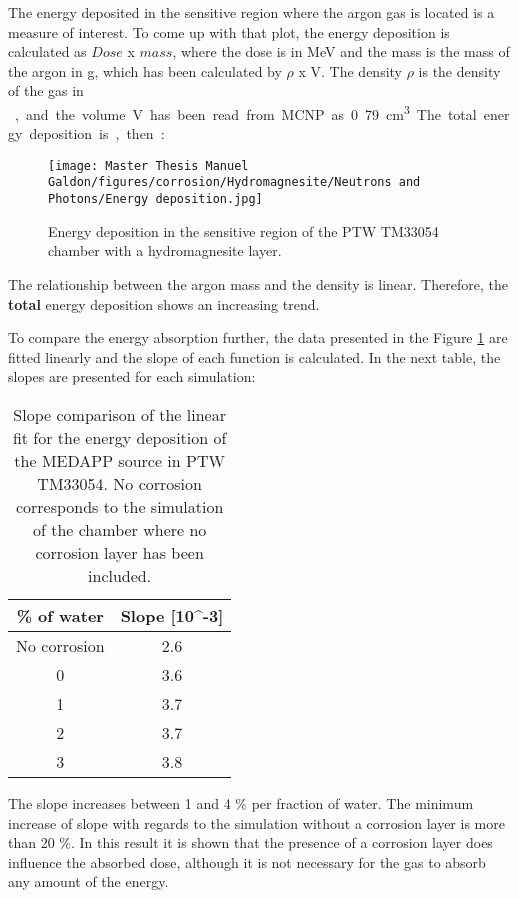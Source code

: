 The energy deposited in the sensitive region where the argon gas is located is a measure of interest. To come up with that plot, the energy deposition is calculated as $Dose$ x $mass$, where the dose is in \unit{\mega\electronvolt} and the mass is the mass of the argon in \unit{\gram}, which has been calculated by $\rho$ x V. The density $\rho$ is the density of the gas in \unit{\gram\per\cubic\centimeter}, and the volume V has been read from MCNP as 0.79 \unit{\cubic\cm}. The total energy deposition is, then:
\newpage
\begin{figure}[!h]
  \centering
  \texttt{[image: Master Thesis Manuel Galdon/figures/corrosion/Hydromagnesite/Neutrons and Photons/Energy deposition.jpg]}
  \caption{Energy deposition in the sensitive region of the PTW TM33054 chamber with a  hydromagnesite layer.}
  \label{fig:PTW-33053 with hydromagnesite. Energy deposition}
\end{figure}

The relationship between the argon mass and the density is linear. Therefore, the \textbf{total} energy deposition shows an increasing trend.

To compare the energy absorption further, the data presented in the Figure \ref{fig:PTW-33053 with hydromagnesite. Energy deposition} are fitted linearly and the slope of each function is calculated. In the next table, the slopes are presented for each simulation: 

\begin{table}[!h]
\centering
\begin{tabular}{|c|c|}
\hline
\rowcolor[HTML]{A9D9C6} 
\% of water & Slope [10^{-3}]\\ \hline
No corrosion           & 2.6\\ \hline
0           & 3.6                                \\ \hline
1           & 3.7                               \\ \hline
2           & 3.7                               \\ \hline
3           & 3.8                               \\ \hline
\end{tabular}
\caption{Slope comparison of the linear fit for the energy deposition of the MEDAPP source in PTW TM33054. No corrosion corresponds to the simulation of the chamber where no corrosion layer has been included.}
\label{table: Slope comparison for MEDAPP source at the energy deposition}
\end{table}
The slope increases between 1 and 4 $\%$ per fraction of water. The minimum increase of slope with regards to the simulation without a corrosion layer is more than 20 $\%$. In this result it is shown that the presence of a corrosion layer does influence the absorbed dose, although it is not necessary for the gas to absorb any amount of the energy.


